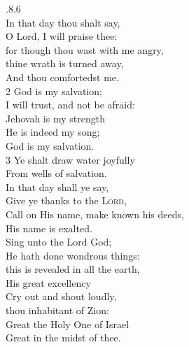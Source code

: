 \documentclass{article}
\begin{document}
\begin{multicols}{2}
.8.6\\


 In that day thou shalt say,\\
O Lord, I will praise thee:\\
for though thou wast with me angry,\\ 
thine wrath is turned away,\\
 
\noindent And thou comfortedst me.\\
2 God is my salvation; \\
I will trust, and not be afraid:\\
Jehovah is my strength\\

\noindent He is indeed my song;\\ 
God is my salvation.\\
3 Ye shalt draw water joyfully\\ 
From wells of salvation.\\

 In that day shall ye say,\\ 
Give ye thanks to the \textsc{Lord},\\ 
Call on His name, make known his deeds,\\
His name is exalted.\\

 Sing unto the Lord God;\\
He hath done wondrous things:\\
this is revealed in all the earth,\\
His great excellency\\

 Cry out and shout loudly,\\
thou inhabitant of Zion:\\
Great the Holy One of Israel\\
Great in the midst of thee.\\

\end{multicols}
\end{document}
